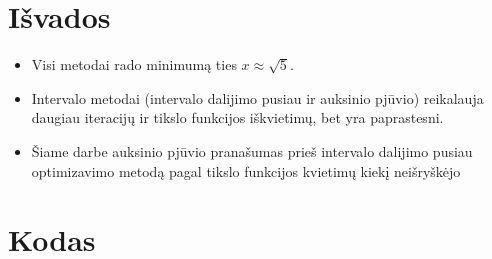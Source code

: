 \documentclass[a4paper,12pt]{article}
\begin{document}
\section{Išvados}
\begin{itemize}
    \item Visi metodai rado minimumą ties $x \approx \sqrt{5}$.
    \item Intervalo metodai (intervalo dalijimo pusiau ir auksinio pjūvio) reikalauja daugiau iteracijų ir tikslo funkcijos iškvietimų, bet yra paprastesni.
    \item Šiame darbe auksinio pjūvio pranašumas prieš intervalo dalijimo pusiau optimizavimo metodą pagal tikslo funkcijos kvietimų kiekį neišryškėjo
\end{itemize}

\section{Kodas}

\end{document}
